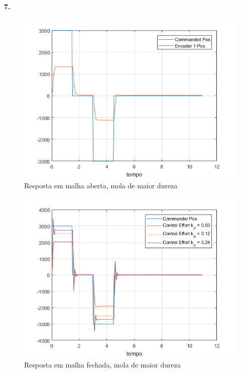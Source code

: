 \documentclass[a4paper,11pt]{article}
\begin{document}
\textbf{7.}
\begin{figure}[H]
\centering
\includegraphics{exp02e07-aberta}
\caption{Resposta em malha aberta, mola de maior dureza}
\end{figure}
\begin{figure}[H]
\centering
\includegraphics{exp02e07-fechada}
\caption{Resposta em malha fechada, mola de maior dureza}
\end{figure}
\end{document}
